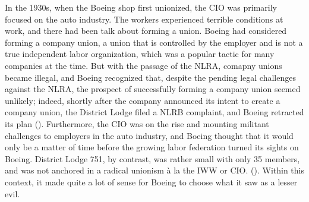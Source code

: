 \documentclass[12pt]{article}
\begin{document}
In the 1930s, when the Boeing shop first unionized, the CIO was primarily focused on the auto industry. The workers experienced terrible conditions at work, and there had been talk about forming a union. Boeing had considered forming a company union, a union that is controlled by the employer and is not a true independent labor organization, which was a popular tactic for many companies at the time. But with the passage of the NLRA, comapny unions became illegal, and Boeing recognized that, despite the pending legal challenges against the NLRA, the prospect of successfully forming a company union seemed unlikely; indeed, shortly after the company announced its intent to create a company union, the District Lodge filed a NLRB complaint, and Boeing retracted its plan (\cite[23-24]{mccannBloodWaterHistory1989}). Furthermore, the CIO was on the rise and mounting militant challenges to employers in the auto industry, and Boeing thought that it would only be a matter of time before the growing labor federation turned its sights on Boeing. District Lodge 751, by contrast, was rather small with only 35 members, and was not anchored in a radical unionism \`{a} la the IWW or CIO. (\cite[24]{mccannBloodWaterHistory1989}). Within this context, it made quite a lot of sense for Boeing to choose what it saw as a lesser evil.



\end{document}
